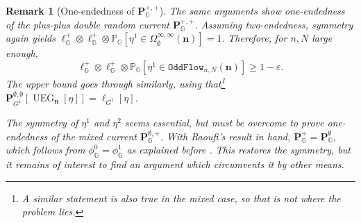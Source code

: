 \documentclass[article,11pt,reqno]{amsart}
\newcommand{\Prbcur}{\mathbf{P}}
\newcommand{\nn}{\mathbf{n}}
\newtheorem{remark}[theorem]{Remark}
\begin{document}

\begin{remark}[One-endedness of $\Prbcur_{\mathbb{G}}^{+,+}$]
The same arguments show one-endedness of the plus-plus double random current $\Prbcur_{\mathbb{G}}^{+,+}$.
Assuming two-endedness, symmetry again yields 
    $
\ell^+_{\mathbb{G}}\otimes \ell^+_{\mathbb{G}}\otimes \mathbb{P}_{\mathbb{G}}[\eta^1 \in \Omega_\emptyset^{\infty,\infty}(\nn)] = 1.
$
Therefore, for $n,N$ large enough, 
     $$
\ell^+_{\mathbb{G}}\otimes \ell^+_{\mathbb{G}}\otimes \mathbb{P}_{\mathbb{G}}[\eta^1 \in \mathtt{OddFlow}_{n,N}(\nn)] \geq 1-\varepsilon.
$$
The upper bound goes through similarly, using that\footnote{A similar statement is also true in the mixed case, so that is not where the problem lies.} $\Prbcur_{G^1}^{\emptyset,\emptyset}[ \operatorname{UEG}_{\nn}[\eta]] = \ell_{G^1}[\eta]$. 

The symmetry of $\eta^1$ and $\eta^2$ seems essential, but must be overcome to prove one-endedness of the mixed current $\Prbcur_{\mathbb{G}}^{\emptyset,+}$. With Raoufi's result in hand, $\Prbcur_{\mathbb{G}}^+ = \Prbcur_{\mathbb{G}}^\emptyset$, which follows from $\phi_{\mathbb{G}}^0 = \phi_{\mathbb{G}}^1$ as explained before . This restores the symmetry, but it remains of interest to find an argument which circumvents it by other means.
\end{remark}
\end{document}

